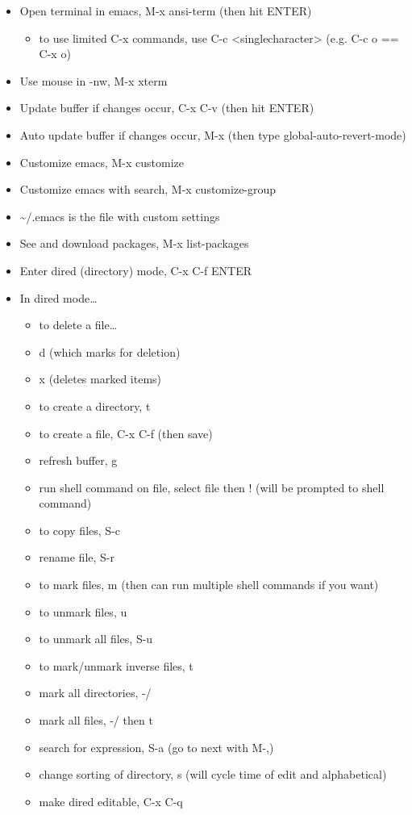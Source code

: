 \documentclass[11pt]{article}
\begin{document}
\begin{itemize}
\item Open terminal in emacs, M-x ansi-term (then hit ENTER)
\begin{itemize}
\item to use limited C-x commands, use C-c <singlecharacter> (e.g. C-c o == C-x o)
\end{itemize}
\item Use mouse in -nw, M-x xterm
\item Update buffer if changes occur, C-x C-v (then hit ENTER)
\item Auto update buffer if changes occur, M-x (then type global-auto-revert-mode)
\item Customize emacs, M-x customize
\item Customize emacs with search, M-x customize-group
\item \textasciitilde{}/.emacs is the file with custom settings
\item See and download packages, M-x list-packages
\item Enter dired (directory) mode, C-x C-f ENTER
\item In dired mode\ldots{}
\begin{itemize}
\item to delete a file\ldots{}
\item d (which marks for deletion)
\item x (deletes marked items)
\item to create a directory, t
\item to create a file, C-x C-f (then save)
\item refresh buffer, g
\item run shell command on file, select file then ! (will be prompted to shell command)
\item to copy files, S-c
\item rename file, S-r
\item to mark files, m (then can run multiple shell commands if you want)
\item to unmark files, u
\item to unmark all files, S-u
\item to mark/unmark inverse files, t
\item mark all directories, -/
\item mark all files, -/ then t
\item search for expression, S-a (go to next with M-,)
\item change sorting of directory, s (will cycle time of edit and alphabetical)
\item make dired editable, C-x C-q

\end{itemize}
\end{itemize}
\end{document}
